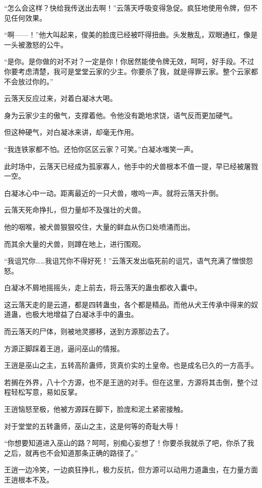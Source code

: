 \begin{this_body}
“怎么会这样？快给我传送出去啊！”云落天呼吸变得急促。疯狂地使用令牌，但不见任何效果。

“啊——！”他大叫起来，俊美的脸庞已经被吓得扭曲。头发散乱，双眼通红，像是一头被激怒的公牛。

“是你。是你做的对不对？一定是你！你居然能使令牌无效，呵呵，好手段。不过你要考虑清楚，我可是堂堂云家的少主。你要杀了我，就是得罪云家。整个云家都不会放过你的。”

云落天反应过来，对着白凝冰大喝。

身为云家少主的傲气，支撑着他。令他没有跪地求饶，语气反而更加硬气。

但这种硬气，对白凝冰来讲，却毫无作用。

“我连铁家都不怕。还怕你区区云家？可笑。”白凝冰嗤笑一声。

此时场中，云落天已经成为孤家寡人，他手中的犬兽根本不值一提，早已经被屠戮一空。

白凝冰心中一动。距离最近的一只犬兽，嗷呜一声。就将云落天扑倒。

云落天死命挣扎，但力量却不及强壮的犬兽。

他的咽喉，被犬兽狠狠咬住，大量的鲜血从伤口处喷涌而出。

而其余大量的犬兽，则蹲在地上，进行围观。

“我诅咒你……我诅咒你不得好死！”云落天发出临死前的诅咒，语气充满了憎恨怨怒。

白凝冰不屑地摇摇头，走上前去，将云落天的蛊虫都收入囊中。

这云落天走的是云道，都是四转蛊虫，各个都是精品。而他从犬王传承中得来的奴道蛊，也极大地增益了白凝冰手中的蛊虫。

而云落天的尸体，则被地灵挪移，送到方源那边去了。

方源正脚踩着王逍，逼问巫山的情报。

王逍是巫山之主，五转高阶蛊师，货真价实的土皇帝。也是成名已久的一方高手。

若搁在外界，八十个方源，也不是王逍的对手。但在这里，方源将其击倒，整个过程轻松写意，易如反掌。

王逍恼怒至极，他被方源踩在脚下，脸庞和泥土紧密接触。

对于堂堂的五转蛊师，巫山之主，这是何等的奇耻大辱！

“你想要知道进入巫山的路？呵呵，别痴心妄想了！你要杀我就杀了吧，你杀了我之后，就再也不会知道那条正确的路径了。”

王逍一边冷笑，一边疯狂挣扎，极力反抗，但方源可以动用力道蛊虫，在力量方面王逍根本不及。


\end{this_body}
